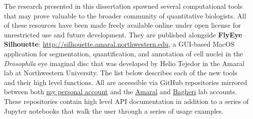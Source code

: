 The research presented in this dissertation spawned several computational tools that may prove valuable to the broader community of quantitative biologists. All of these resources have been made freely available online under open license for unrestricted use and future development. They are published alongside \textbf{FlyEye Silhouette}: \url{http://silhouette.amaral.northwestern.edu}, a GUI-based MacOS application for segmentation, quantification, and annotation of cell nuclei in the \textit{Drosophila} eye imaginal disc that was developed by Helio Tejedor in the Amaral lab at Northwestern University. The list below describes each of the new tools and their high level functions. All are accessible via GitHub repositories mirrored between both \href{https://github.com/sebastianbernasek/}{my personal account} and the \href{https://github.com/amarallab}{Amaral} and \href{https://github.com/bagherilab}{Bagheri} lab accounts. These repositories contain high level API documentation in addition to a series of Jupyter notebooks that walk the user through a series of usage examples. 

